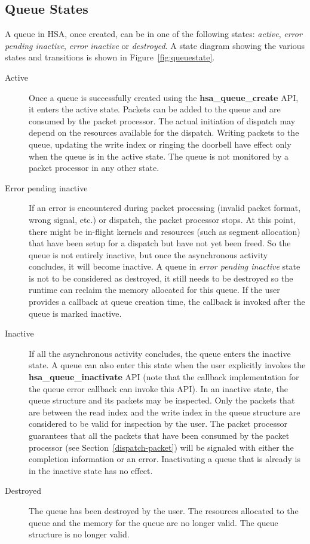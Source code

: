 \documentclass[final]{book}
\newcommand{\reffun}[1]{\textbf{#1}}
\begin{document}
\hypertarget{queue-errors}{}\subsection{Queue States} \label{queue-errors}

A queue in HSA, once created, can be in one of the following states:
\emph{active}, \emph{error pending inactive}, \emph{error inactive} or
\emph{destroyed}. A state diagram showing the various states and transitions is
shown in Figure~\ref{fig:queuestate}.

\begin{description}
\item[Active] Once a queue is successfully created using the
  \reffun{hsa_queue_create} API, it enters the active state. Packets can be
  added to the queue and are consumed by the packet processor. The actual
  initiation of dispatch may depend on the resources available for the
  dispatch. Writing packets to the queue, updating the write index or ringing
  the doorbell have effect only when the queue is in the active state. The queue
  is not monitored by a packet processor in any other state.

\item[Error pending inactive] If an error is encountered during packet
  processing (invalid packet format, wrong signal, etc.) or dispatch, the packet
  processor stops. At this point, there might be in-flight kernels and resources
  (such as segment allocation) that have been setup for a dispatch but have not
  yet been freed. So the queue is not entirely inactive, but once the
  asynchronous activity concludes, it will become inactive. A queue in
  \emph{error pending inactive} state is not to be considered as destroyed, it
  still needs to be destroyed so the runtime can reclaim the memory allocated
  for this queue. If the user provides a callback at queue creation time, the
  callback is invoked after the queue is marked inactive.

\item[Inactive] If all the asynchronous activity concludes, the queue enters the
  inactive state. A queue can also enter this state when the user explicitly
  invokes the \reffun{hsa_queue_inactivate} API (note that the callback
  implementation for the queue error callback can invoke this API). In an
  inactive state, the queue structure and its packets may be inspected. Only the
  packets that are between the read index and the write index in the queue
  structure are considered to be valid for inspection by the user. The packet
  processor guarantees that all the packets that have been consumed by the
  packet processor (see Section~\ref{dispatch-packet}) will be signaled with
  either the completion information or an error. Inactivating a queue that is
  already is in the inactive state has no effect.

\item[Destroyed] The queue has been destroyed by the user. The resources
  allocated to the queue and the memory for the queue are no longer valid. The
  queue structure is no longer valid.
\end{description}
\end{document}
